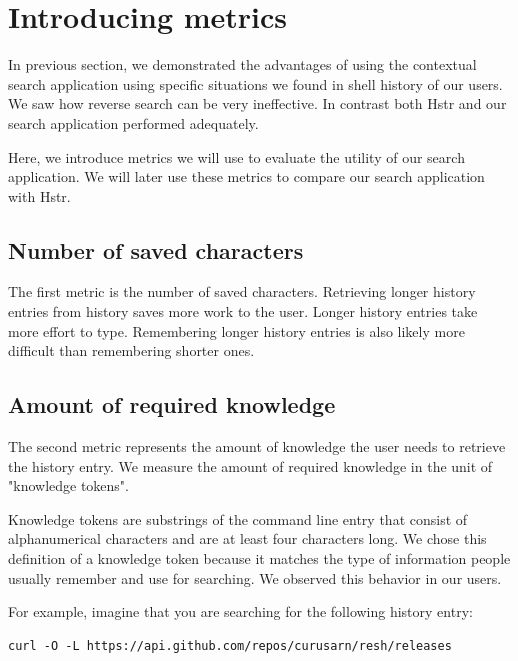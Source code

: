 \section{Introducing metrics}

In previous section, we demonstrated the advantages of using the contextual search application using specific situations we found in shell history of our users. We saw how reverse search can be very ineffective. In contrast both Hstr and our search application performed adequately.

Here, we introduce metrics we will use to evaluate the utility of our search application. We will later use these metrics to compare our search application with Hstr. 

\subsection{Number of saved characters}

The first metric is the number of saved characters. Retrieving longer history entries from history saves more work to the user. Longer history entries take more effort to type. Remembering longer history entries is also likely more difficult than remembering shorter ones. 


\subsection{Amount of required knowledge}\label{knowledge-tokens}

The second metric represents the amount of knowledge the user needs to retrieve the history entry. We measure the amount of required knowledge in the unit of "knowledge tokens".

Knowledge tokens are substrings of the command line entry that consist of alphanumerical characters and are at least four characters long. We chose this definition of a knowledge token because it matches the type of information people usually remember and use for searching. We observed this behavior in our users. 

\newpage 
For example, imagine that you are searching for the following history entry:
\begin{verbatim}
curl -O -L https://api.github.com/repos/curusarn/resh/releases  
\end{verbatim}

